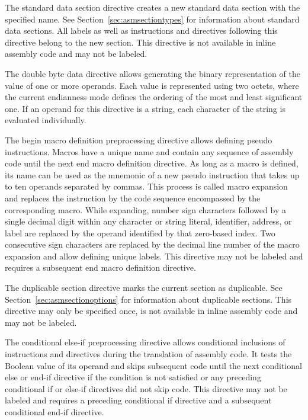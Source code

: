 The standard data section directive creates a new standard data section with the specified name.
See Section~\ref{sec:asmsectiontypes} for information about standard data sections.
All labels as well as instructions and directives following this directive belong to the new section.
This directive is not available in inline assembly code and may not be labeled.


The double byte data directive allows generating the binary representation of the value of one or more operands.
Each value is represented using two octets, where the current endianness mode defines the ordering of the most and least significant one.
If an operand for this directive is a string, each character of the string is evaluated individually.


The begin macro definition preprocessing directive allows defining pseudo instructions.
Macros have a unique name and contain any sequence of assembly code until the next end macro definition directive.
As long as a macro is defined, its name can be used as the mnemonic of a new pseudo instruction that takes up to ten operands separated by commas.
This process is called macro expansion and replaces the instruction by the code sequence encompassed by the corresponding macro.
While expanding, number sign characters followed by a single decimal digit within any character or string literal, identifier, address, or label are replaced by the operand identified by that zero-based index.
Two consecutive sign characters are replaced by the decimal line number of the macro expansion and allow defining unique labels.
This directive may not be labeled and requires a subsequent end macro definition directive.


The duplicable section directive marks the current section as duplicable.
See Section~\ref{sec:asmsectionoptions} for information about duplicable sections.
This directive may only be specified once, is not available in inline assembly code and may not be labeled.


The conditional else-if preprocessing directive allows conditional inclusions of instructions and directives during the translation of assembly code.
It tests the Boolean value of its operand and skips subsequent code until the next conditional else or end-if directive
if the condition is not satisfied or any preceding conditional if or else-if directives did not skip code.
This directive may not be labeled and requires a preceding conditional if directive and a subsequent conditional end-if directive.

